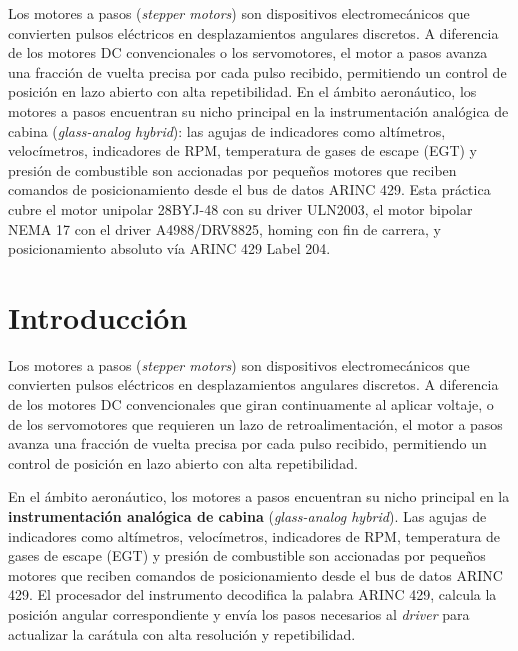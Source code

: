 \documentclass[11pt]{article}
\begin{document}
\portada

\begin{resumen}
Los motores a pasos (\emph{stepper motors}) son dispositivos electromecánicos que
convierten pulsos eléctricos en desplazamientos angulares discretos. A diferencia de los
motores DC convencionales o los servomotores, el motor a pasos avanza una fracción de
vuelta precisa por cada pulso recibido, permitiendo un control de posición en lazo
abierto con alta repetibilidad. En el ámbito aeronáutico, los motores a pasos encuentran
su nicho principal en la instrumentación analógica de cabina (\emph{glass-analog
hybrid}): las agujas de indicadores como altímetros, velocímetros, indicadores de RPM,
temperatura de gases de escape (EGT) y presión de combustible son accionadas por pequeños
motores que reciben comandos de posicionamiento desde el bus de datos ARINC 429. Esta
práctica cubre el motor unipolar 28BYJ-48 con su driver ULN2003, el motor bipolar
NEMA 17 con el driver A4988/DRV8825, homing con fin de carrera, y posicionamiento
absoluto vía ARINC 429 Label 204.
\end{resumen}

\tableofcontents
\newpage

\section{Introducción}

Los motores a pasos (\emph{stepper motors}) son dispositivos electromecánicos que
convierten pulsos eléctricos en desplazamientos angulares discretos. A diferencia de los
motores DC convencionales que giran continuamente al aplicar voltaje, o de los
servomotores que requieren un lazo de retroalimentación, el motor a pasos avanza una
fracción de vuelta precisa por cada pulso recibido, permitiendo un control de posición en
lazo abierto con alta repetibilidad.

En el ámbito aeronáutico, los motores a pasos encuentran su nicho principal en la
\textbf{instrumentación analógica de cabina} (\emph{glass-analog hybrid}). Las agujas de
indicadores como altímetros, velocímetros, indicadores de RPM, temperatura de gases de
escape (EGT) y presión de combustible son accionadas por pequeños motores que reciben
comandos de posicionamiento desde el bus de datos ARINC 429. El procesador del
instrumento decodifica la palabra ARINC 429, calcula la posición angular correspondiente
y envía los pasos necesarios al \emph{driver} para actualizar la carátula con alta
resolución y repetibilidad.
\end{document}
